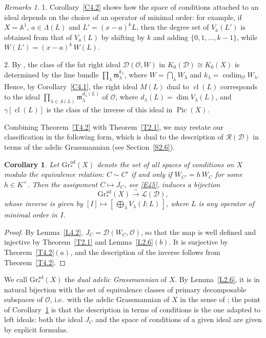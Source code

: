 \documentclass[11pt,reqno]{amsart}
\theoremstyle{plain}
\newtheorem{corollary}{Corollary}[section]
\theoremstyle{definition}
\theoremstyle{remark}
\newtheorem*{remarks}{Remarks}
\numberwithin{equation}{section}
\newcommand{\cD}{\mathcal{D}}
\newcommand{\cO}{\mathcal{O}}
\newcommand{\cL}{\mathcal{L}}
\newcommand{\cR}{\mathcal{R}}
\newcommand{\A}{\mathbb{A}}
\newcommand{\ml}{\mathfrak{m}_\lambda}
\DeclareMathOperator{\cl}{cl}
\DeclareMathOperator{\Pic}{Pic}
\DeclareMathOperator{\codim}{codim}
\begin{document}
\begin{remarks}
1. Corollary~\ref{C4.2} shows how the space of conditions attached to an ideal depends on the
choice of an operator of minimal order: for example, if $X = \A^1$, $a \in \Lambda(L)$ and
$L' = (x - a)^k L$, then the degree set of $V_a(L')$ is obtained from that of $V_a(L)$ by shifting
by $k$ and adding $\{0, 1, \ldots, k-1\}$, while $W(L') = (x-a)^k\, W(L)$.

2. By \cite[Section~5]{BerestWilson09}, the class of the fat right ideal $\cD(\cO, W)$ in
$K_0(\cD) \cong K_0(X)$ is determined by the line bundle $\prod_\lambda \ml^{k_\lambda}$, where
$W = \bigcap_\lambda W_\lambda$ and $k_\lambda = \codim_{\cO} W_\lambda$. Hence, by
Corollary~\ref{C4.1}, the right ideal $M(L)$ dual to $\cl(L)$ corresponds to the ideal
$\prod_{\lambda \in \Lambda(L)} \ml^{d_\lambda(L)}$ of $\cO$, where $d_\lambda(L) = \dim
V_\lambda(L)$, and $\gamma[\cl(L)]$ is the class of the inverse of this ideal in $\Pic(X)$.
\end{remarks}

Combining Theorem~\ref{T4.2} with Theorem~\ref{T2.1}, we may restate our classification in the
following form, which is dual to the description of $\cR(\cD)$ in terms of the adelic
Grassmannian (see Section~\ref{S2.6}).

\begin{corollary}
\label{C4.3}
Let $\mathrm{Gr}^{\mathrm{ad}}_*(X)$ denote the set of all spaces of conditions on $X$ modulo the
equivalence relation: $C \sim C'$ if and only if $W_{C'} = h\, W_C$ for some $h \in K^\times$.
Then the assignment $C \mapsto J_C$, see \eqref{E45}, induces a bijection
\[
  \mathrm{Gr}^{\mathrm{ad}}_*(X) \stackrel{\sim}{\longrightarrow} \cL(\cD) ,
\]
whose inverse is given by $[I] \mapsto [\,\bigoplus_\lambda V_\lambda(I;L)\,]$, where $L$ is any
operator of minimal order in $I$.
\end{corollary}

\begin{proof}
By Lemma~\ref{L4.2}, $J_C = \cD(W_C, \cO)$, so that the map is well defined and injective by
Theorem~\ref{T2.1} and Lemma~\ref{L2.6}$(b)$. It is surjective by Theorem~\ref{T4.2}$(a)$, and the
description of the inverse follows from Theorem~\ref{T4.2}.
\end{proof}

We call $\mathrm{Gr}^{\mathrm{ad}}_*(X)$ the \emph{dual adelic Grassmannian} of $X$. By
Lemma~\ref{L2.6}, it is in natural bijection with the set of equivalence classes of primary
decomposable subspaces of $\cO$, i.e.\ with the adelic Grassmannian of $X$ in the sense of
\cite{CanningsHolland1994, BerestWilson09}; the point of Corollary~\ref{C4.3} is that the
description in terms of conditions is the one adapted to left ideals: both the ideal $J_C$ and
the space of conditions of a given ideal are given by explicit formulas.
\end{document}

